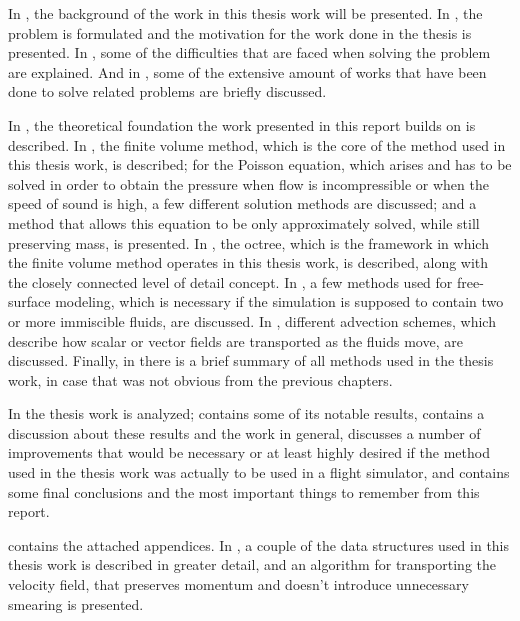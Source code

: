 
In , the background of the work in this thesis work will be presented. In 
, the problem is formulated and the motivation for the work done in the thesis is presented. In , some of the difficulties that are faced when solving the problem are explained. And in , some of the extensive amount of works that have been done to solve related problems are briefly discussed.

In , the theoretical foundation the work presented in this report builds on is described. In , the finite volume method, which is the core of the method used in this thesis work, is described; for the Poisson equation, which arises and has to be solved in order to obtain the pressure when flow is incompressible or when the speed of sound is high, a few different solution methods are discussed; and a method that allows this equation to be only approximately solved, while still preserving mass, is presented. In , the octree, which is the framework in which the finite volume method operates in this thesis work, is described, along with the closely connected level of detail concept. In , a few methods used for free-surface modeling, which is necessary if the simulation is supposed to contain two or more immiscible fluids, are discussed. In , different advection schemes, which describe how scalar or vector fields are transported as the fluids move, are discussed. Finally, in  there is a brief summary of all methods used in the thesis work, in case that was not obvious from the previous chapters.

In  the thesis work is analyzed;  contains some of its notable results,  contains a discussion about these results and the work in general,  discusses a number of improvements that would be necessary or at least highly desired if the method used in the thesis work was actually to be used in a flight simulator, and  contains some final conclusions and the most important things to remember from this report.

 contains the attached appendices. In , a couple of the data structures used in this thesis work is described in greater detail, and an algorithm for transporting the velocity field, that preserves momentum and doesn't introduce unnecessary smearing is presented.

